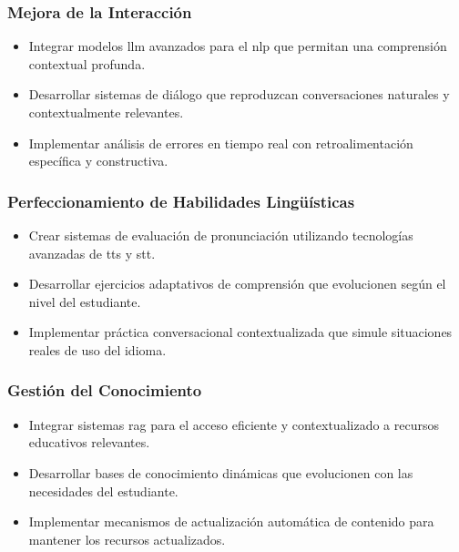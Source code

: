 \subsubsection{Mejora de la Interacción}
\label{subsubsec:mejora-interaccion}

\begin{itemize}
  \item Integrar modelos \gls{llm} avanzados para el \gls{nlp} que permitan una comprensión contextual profunda.
  \item Desarrollar sistemas de diálogo que reproduzcan conversaciones naturales y contextualmente relevantes.
  \item Implementar análisis de errores en tiempo real con retroalimentación específica y constructiva.
\end{itemize}

\subsubsection{Perfeccionamiento de Habilidades Lingüísticas}
\label{subsubsec:perfeccionamiento-habilidades}

\begin{itemize}
  \item Crear sistemas de evaluación de pronunciación utilizando tecnologías avanzadas de \gls{tts} y \gls{stt}.
  \item Desarrollar ejercicios adaptativos de comprensión que evolucionen según el nivel del estudiante.
  \item Implementar práctica conversacional contextualizada que simule situaciones reales de uso del idioma.
\end{itemize}

\subsubsection{Gestión del Conocimiento}
\label{subsubsec:gestion-conocimiento}

\begin{itemize}
  \item Integrar sistemas \gls{rag} para el acceso eficiente y contextualizado a recursos educativos relevantes.
  \item Desarrollar bases de conocimiento dinámicas que evolucionen con las necesidades del estudiante.
  \item Implementar mecanismos de actualización automática de contenido para mantener los recursos actualizados.
\end{itemize}